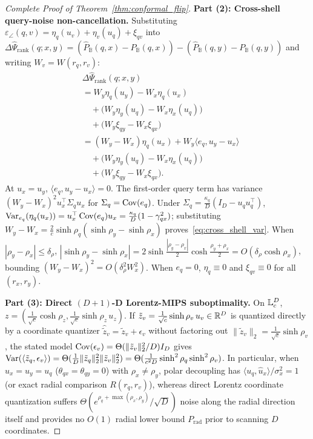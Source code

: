 \begin{proof}[Complete Proof of Theorem~\ref{thm:conformal_flip}]
\textbf{Part (2): Cross-shell query-noise non-cancellation.}
Substituting $\varepsilon_\angle(q, v) = \eta_q(u_v) + \eta_v(u_q) + \xi_{qv}$ into $\Delta\widehat{\Psi}_{\mathrm{rank}}(q; x, y) = (\widehat{P}_{\mathbb{B}}(q, x) - P_{\mathbb{B}}(q, x)) - (\widehat{P}_{\mathbb{B}}(q, y) - P_{\mathbb{B}}(q, y))$ and writing $W_v = W(r_q, r_v)$:
\begin{equation}
  \begin{aligned}
    &\Delta\widehat{\Psi}_{\mathrm{rank}}(q; x, y) \\
    &= W_y\eta_q(u_y) - W_x\eta_q(u_x) \\
    &\quad+ \bigl(W_y\eta_y(u_q) - W_x\eta_x(u_q)\bigr) \\
    &\quad+ \bigl(W_y\xi_{qy} - W_x\xi_{qx}\bigr) \\
    &= (W_y - W_x)\eta_q(u_x) + W_y\langle e_q, u_y - u_x\rangle \\
    &\quad+ \bigl(W_y\eta_y(u_q) - W_x\eta_x(u_q)\bigr) \\
    &\quad+ \bigl(W_y\xi_{qy} - W_x\xi_{qx}\bigr).
  \end{aligned}
\end{equation}
At $u_x = u_y$, $\langle e_q, u_y - u_x\rangle = 0$.
The first-order query term has variance $(W_y-W_x)^2u_x^\top\Sigma_qu_x$ for $\Sigma_q=\operatorname{Cov}(e_q)$. Under $\Sigma_q=\frac{\kappa_q}{D}(I_D-u_qu_q^\top)$, $\operatorname{Var}_{e_q}(\eta_q(u_x)) = u_x^\top \operatorname{Cov}(e_q) u_x = \frac{\kappa_q}{D}(1 - \gamma_{qx}^2)$; substituting $W_y - W_x = \frac{2}{c}\sinh\rho_q(\sinh\rho_y - \sinh\rho_x)$ proves~\eqref{eq:cross_shell_var}.
When $|\rho_y - \rho_x| \le \delta_\rho$, $|\sinh\rho_y - \sinh\rho_x| = 2\sinh\frac{|\rho_y - \rho_x|}{2}\cosh\frac{\rho_y + \rho_x}{2} = O(\delta_\rho\cosh\rho_x)$, bounding $(W_y - W_x)^2 = O(\delta_\rho^2 W_x^2)$.
When $e_q = 0$, $\eta_q \equiv 0$ and $\xi_{qv} \equiv 0$ for all $(r_x, r_y)$.

\textbf{Part (3): Direct $(D+1)$-D {Lorentz}-MIPS suboptimality.}
On $\mathbb{L}_c^D$, $z = (\frac{1}{\sqrt{c}}\cosh\rho_z, \frac{1}{\sqrt{c}}\sinh\rho_z\,u_z)$.
If $\tilde{z}_v = \frac{1}{\sqrt{c}}\sinh\rho_v\,u_v \in \mathbb{R}^D$ is quantized directly by a coordinate quantizer $\hat{\tilde{z}}_v = \tilde{z}_v + \epsilon_v$ without factoring out $\|\tilde{z}_v\|_2 = \frac{1}{\sqrt{c}}\sinh\rho_v$, the stated model $\operatorname{Cov}(\epsilon_v)=\Theta(\|\tilde z_v\|_2^2/D)I_D$ gives $\operatorname{Var}(\langle \tilde{z}_q, \epsilon_v\rangle) = \Theta(\frac{1}{D}\|\tilde{z}_q\|_2^2 \|\tilde{z}_v\|_2^2) = \Theta(\frac{1}{c^2 D}\sinh^2\rho_q\sinh^2\rho_v)$.
In particular, when $u_x = u_y = u_q$ ($\theta_{qx} = \theta_{qy} = 0$) with $\rho_x \ne \rho_y$, polar decoupling has $\langle u_q, \hat{u}_x\rangle/\sigma_x^2 = 1$ (or exact radial comparison $R(r_q, r_v)$), whereas direct Lorentz coordinate quantization suffers $\Theta(e^{\rho_q + \max(\rho_x,\rho_y)}/\sqrt{D})$ noise along the radial direction itself and provides no $O(1)$ radial lower bound $P_{\mathrm{rad}}$ prior to scanning $D$ coordinates.
\end{proof}


